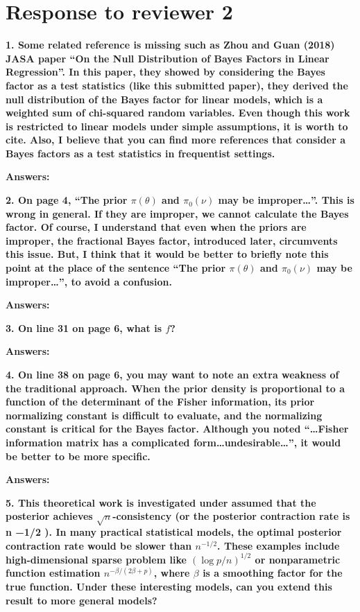 \documentclass[11pt]{article}
\theoremstyle{plain}
\theoremstyle{definition}
\theoremstyle{remark}
\begin{document}
\section{Response to reviewer 2}
\textbf{
    1.
    Some related reference is missing such as Zhou and Guan (2018) JASA paper “On the Null Distribution of Bayes Factors in Linear Regression”.
    In this paper, they showed by considering the Bayes factor as a test statistics (like this submitted paper), they derived the null distribution of the Bayes factor for linear models, which is a weighted sum of chi-squared random variables.
    Even though this work is restricted to linear models under simple assumptions, it is worth to cite.
    Also, I believe that you can find more references that consider a Bayes factors as a test statistics in frequentist settings.
}

\textbf{Answers:}



\textbf{
    2.
    On page 4, ``The prior $\pi(\theta)$ and $\pi_0 (\nu)$ may be improper\dots''.
    This is wrong in general.
    If they are improper, we cannot calculate the Bayes factor.
    Of course, I understand that even when the priors are improper, the fractional Bayes factor, introduced later, circumvents this issue.
    But, I think that it would be better to briefly note this point at the place of the sentence ``The prior $\pi(\theta)$ and $\pi_0 (\nu)$ may be improper\dots'', to avoid a confusion.
}

\textbf{Answers:}



\textbf{
    3. On line 31 on page 6, what is $f$?
}

\textbf{Answers:}




\textbf{
    4. On line 38 on page 6, you may want to note an extra weakness of the traditional approach.
    When the prior density is proportional to a function of the determinant of the Fisher information, its prior normalizing constant is difficult to evaluate, and the normalizing constant is critical for the Bayes factor.
    Although you noted ``\dots Fisher information matrix has a complicated form\dots undesirable\dots'', it would be better to be more specific.
}

\textbf{Answers:}




\textbf{
    5. This theoretical work is investigated under assumed that the posterior achieves $\sqrt n$-consistency (or the posterior contraction rate is n −1/2 ).
    In many practical statistical models, the optimal posterior contraction rate would be slower than $n^{-1/2}$.
    These examples include high-dimensional sparse problem like $(\log p /n)^{1/2}$ or nonparametric function estimation $n^{-\beta / (2\beta + p)}$, where $\beta$ is a smoothing factor for the true function.
    Under these interesting models, can you extend this result to more general models?
}
\end{document}
